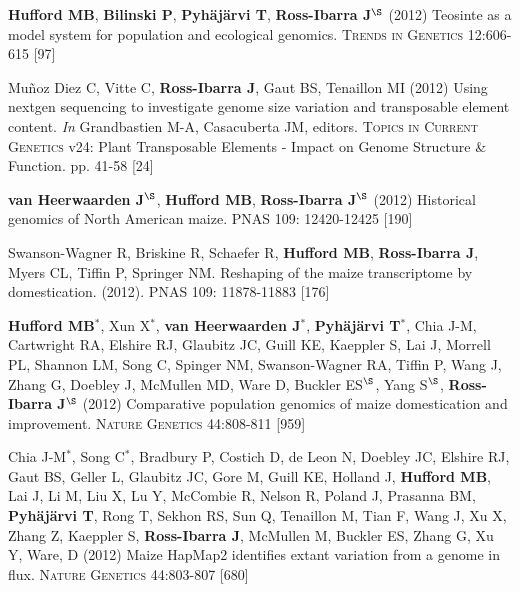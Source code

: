 \documentclass[letterpaper,10pt]{article}
\begin{document}
\begin{etaremune}
\item {\bf Hufford MB}, {\bf Bilinski P}, {\bf Pyh\"aj\"arvi T}, {\bf Ross-Ibarra J}$^\S$ (2012) Teosinte as a model system for population and ecological genomics. \textsc{Trends in Genetics} 12:606-615 %
 [97]\\


\item Mu\~{n}oz Diez C, Vitte C, {\bf Ross-Ibarra J}, Gaut BS, Tenaillon MI (2012) Using nextgen sequencing to investigate genome size variation and transposable element content. \emph{In} Grandbastien M-A, Casacuberta JM, editors. \textsc{Topics in Current Genetics} v24: Plant Transposable Elements - Impact on Genome Structure \& Function. pp. 41-58
 [24]\\


\item  {\bf van Heerwaarden J}$^\S$, {\bf Hufford MB}, {\bf Ross-Ibarra J}$^\S$ (2012) Historical genomics of North American maize. \textsc{PNAS} 109: 12420-12425
 [190]\\


\item Swanson-Wagner R, Briskine R, Schaefer R, {\bf Hufford MB}, {\bf Ross-Ibarra J}, Myers CL, Tiffin P, Springer NM.  Reshaping of the maize transcriptome by domestication. (2012). \textsc{PNAS}  109: 11878-11883
 [176]\\


\item {\bf Hufford MB}$^*$, Xun X$^*$, {\bf van Heerwaarden J}$^*$, {\bf Pyh\"aj\"arvi T}$^*$, Chia J-M, Cartwright RA, Elshire RJ, Glaubitz JC, Guill KE, Kaeppler S, Lai J, Morrell PL, Shannon LM, Song C, Spinger NM, Swanson-Wagner RA, Tiffin P, Wang J, Zhang G, Doebley J, McMullen MD, Ware D, Buckler ES$^\S$, Yang S$^\S$, {\bf Ross-Ibarra J}$^\S$ (2012) Comparative population genomics of maize domestication and improvement. \textsc{Nature Genetics} 44:808-811 %
 [959]\\


\item  Chia J-M$^*$, Song C$^*$, Bradbury P, Costich D, de Leon N, Doebley JC, Elshire RJ, Gaut BS, Geller L, Glaubitz JC, Gore M, Guill KE, Holland J,  {\bf Hufford MB}, Lai J, Li M, Liu X, Lu Y, McCombie R, Nelson R, Poland J, Prasanna BM,  {\bf Pyh\"aj\"arvi T}, Rong T, Sekhon RS,  Sun Q, Tenaillon M, Tian F, Wang J, Xu X, Zhang Z, Kaeppler S, {\bf Ross-Ibarra J}, McMullen M, Buckler ES, Zhang G, Xu Y, Ware, D (2012) Maize HapMap2 identifies extant variation from a genome in flux. \textsc{Nature Genetics} 44:803-807 %
 [680]\\



\end{etaremune}
\end{document}
